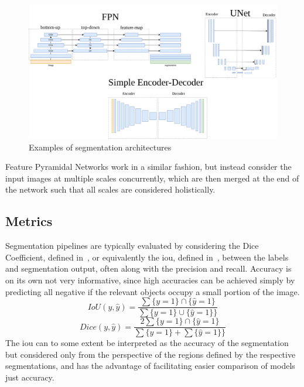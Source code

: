     \begin{figure}[htb]
        \centering
        \includegraphics[width=\linewidth]{illustrations/segmentation_models.png}
        \caption{Examples of segmentation architectures}
        \label{fig:model_expl}
    \end{figure}
    
    Feature Pyramidal Networks work in a similar fashion, but instead consider the input images at multiple scales concurrently, which are then merged at the end of the network such that all scales are considered holistically.
    
    \subsection{Metrics}
        Segmentation pipelines are typically evaluated by considering the Dice Coefficient, defined in~, or equivalently the \gls{iou}, defined in~, between the labels and segmentation output, often along with the precision and recall. Accuracy is on its own not very informative, since high accuracies can be achieved simply by predicting all negative if the relevant objects occupy a small portion of the image.
        \begin{equation}\label{eq:iou}
            IoU(y, \hat{y}) = \frac{\sum \{y=1\}\cap\{\hat{y}=1\} }{\sum \{y=1\} \cup \{\hat{y}=1\}\}}
        \end{equation}
        \begin{equation}\label{eq:dice}
            Dice(y, \hat{y}) = \frac{2\sum \{y=1\}\cap\{\hat{y}=1\} }{\sum \{y=1\} + \sum \{\hat{y}=1\}\}}
        \end{equation}
        The \gls{iou} can to some extent be interpreted as the accuracy of the segmentation but considered only from the perspective of the regions defined by the respective segmentations, and has the advantage of facilitating easier comparison of models just accuracy.
        
